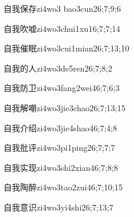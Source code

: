 \begin{verbete}{自我保存}{zi4wo3 bao3cun2}{6;7;9;6}
\end{verbete}

\begin{verbete}{自我吹嘘}{zi4wo3chui1xu1}{6;7;7;14}
\end{verbete}

\begin{verbete}{自我催眠}{zi4wo3cui1mian2}{6;7;13;10}
\end{verbete}

\begin{verbete}{自我的人}{zi4wo3de5ren2}{6;7;8;2}
\end{verbete}

\begin{verbete}{自我防卫}{zi4wo3fang2wei4}{6;7;6;3}
\end{verbete}

\begin{verbete}{自我解嘲}{zi4wo3jie3chao2}{6;7;13;15}
\end{verbete}

\begin{verbete}{自我介绍}{zi4wo3jie4shao4}{6;7;4;8}
\end{verbete}

\begin{verbete}{自我批评}{zi4wo3pi1ping2}{6;7;7;7}
\end{verbete}

\begin{verbete}{自我实现}{zi4wo3shi2xian4}{6;7;8;8}
\end{verbete}

\begin{verbete}{自我陶醉}{zi4wo3tao2zui4}{6;7;10;15}
\end{verbete}

\begin{verbete}{自我意识}{zi4wo3yi4shi2}{6;7;13;7}
\end{verbete}


